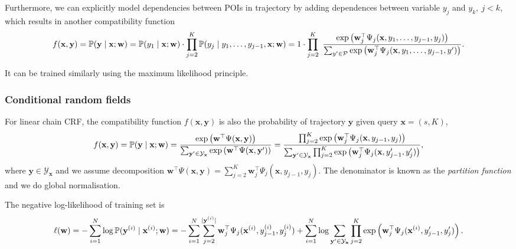 Furthermore, we can explicitly model dependencies between POIs in trajectory by adding dependences between variable $y_j$ and $y_k,~ j < k$,
which results in another compatibility function
\begin{equation*}
f(\mathbf{x}, \mathbf{y}) 
= \mathbb{P}(\mathbf{y} \mid \mathbf{x}; \mathbf{w}) 
= \mathbb{P}(y_1 \mid \mathbf{x}; \mathbf{w}) \cdot \prod_{j=2}^K \mathbb{P}(y_j \mid y_1,\dots, y_{j-1}, \mathbf{x}; \mathbf{w})
= 1 \cdot \prod_{j=2}^{K}~
  \frac{\exp \left(\mathbf{w}_j^\top \Psi_j(\mathbf{x}, y_1, \dots, y_{j-1}, y_j) \right)}
       {\sum_{y' \in \mathcal{P}} \exp \left(\mathbf{w}_j^\top \Psi_j(\mathbf{x}, y_1, \dots, y_{j-1}, y') \right)}.
\end{equation*}

It can be trained similarly using the maximum likelihood principle.



\subsubsection{Conditional random fields}
\label{sec:crf}

For linear chain CRF, the compatibility function $f(\mathbf{x}, \mathbf{y})$ is also the probability of trajectory $\mathbf{y}$ given
query $\mathbf{x} = (s, K)$,
\begin{equation*}
f(\mathbf{x}, \mathbf{y}) = \mathbb{P}(\mathbf{y} \mid \mathbf{x}; \mathbf{w}) 
= \frac{\exp \left( \mathbf{w}^\top \Psi(\mathbf{x}, \mathbf{y}) \right)}
       {\sum_{\mathbf{y}' \in \mathcal{Y}_\mathbf{x}} \exp \left( \mathbf{w}^\top \Psi(\mathbf{x}, \mathbf{y}') \right)}
= \frac{\prod_{j=2}^{K} \exp \left( \mathbf{w}_j^\top \Psi_j(\mathbf{x}, y_{j-1}, y_j) \right)}
       {\sum_{\mathbf{y}' \in \mathcal{Y}_\mathbf{x}} \prod_{j=2}^{K} \exp \left( \mathbf{w}_j^\top \Psi_j(\mathbf{x}, y_{j-1}', y_j') \right)},
\end{equation*}
where $\mathbf{y} \in \mathcal{Y}_\mathbf{x}$ and we assume decomposition 
$\mathbf{w}^\top \Psi(\mathbf{x}, \mathbf{y}) = \sum_{j=2}^{K} \mathbf{w}_j^\top \Psi_j(\mathbf{x}, y_{j-1}, y_j)$.
The denominator is known as the \emph{partition function} and we do global normalisation.

The negative log-likelihood of training set is
\begin{equation*}
\ell(\mathbf{w}) 
= -\sum_{i=1}^N \log \mathbb{P}(\mathbf{y}^{(i)} \mid \mathbf{x}^{(i)}; \mathbf{w})
= -\sum_{i=1}^N \sum_{j=2}^{| \mathbf{y}^{(i)} |} \mathbf{w}_j^\top \Psi_j(\mathbf{x}^{(i)}, y_{j-1}^{(i)}, y_j^{(i)}) +
   \sum_{i=1}^N \log \sum_{\mathbf{y}' \in \mathcal{Y}_\mathbf{x}} 
                \prod_{j=2}^{K} \exp \left(\mathbf{w}_j^\top \Psi_j(\mathbf{x}^{(i)}, y_{j-1}', y_j')\right).
\end{equation*}

